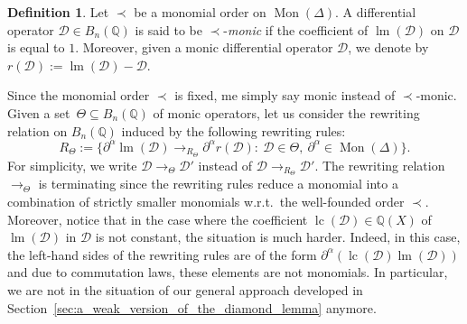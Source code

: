 \documentclass[10pt]{easychair}
\theoremstyle{definition}
\newtheorem{definition}[theorem]{Definition}
\newcommand\D{\mathcal{D}}
\DeclareMathOperator{\lm}{lm}
\DeclareMathOperator{\lc}{lc}
\newcommand\Q{\mathbb{Q}}
\newcommand\Weyl[1]{B_{#1}(\Q)}
\newcommand\monBasis{\Mon(\Delta)}
\DeclareMathOperator{\Mon}{Mon}
\newcommand\rewTheta{\to_\Theta}
\newcommand\RTheta{R_{\Theta}}
\begin{document}
\begin{definition}
  Let $\prec$ be a monomial order on $\monBasis$. A differential
  operator $\D\in\Weyl{n}$ is said to be $\prec$-{\em monic} if the
  coefficient of $\lm(\D)$ on $\D$ is equal to $1$. Moreover, given a
  monic differential operator $\D$, we denote by $r(\D):=\lm(\D)-\D$.
\end{definition}
\smallskip

Since the monomial order $\prec$ is fixed, me simply say monic instead of
$\prec$-monic. Given a set~$\Theta\subseteq\Weyl{n}$ of monic operators,
let us consider the rewriting relation on $\Weyl{n}$ induced by the
following rewriting rules: 
\begin{equation}\label{equ:rewTheta}
  \RTheta:=\Big\{\partial^\alpha\lm(\D)\to_{\RTheta}\partial^\alpha
  r(\D):\ \D\in\Theta,\ \partial^\alpha\in\Mon(\Delta)\Big\}.
\end{equation}
For simplicity, we write $\D\rewTheta\D'$ instead of
$\D\to_{R_\Theta}\D'$. The rewriting relation $\rewTheta$ is terminating
since the rewriting rules reduce a monomial into a combination of
strictly smaller monomials w.r.t.\ the well-founded order $\prec$.
Moreover, notice that in the case where the coefficient $\lc(\D)\in\Q(X)$
of $\lm(\D)$ in $\D$ is not constant, the situation is much harder.
Indeed, in this case, the left-hand sides of the rewriting rules are of
the form $\partial^\alpha(\lc(\D)\lm(\D))$ and due to commutation laws,
these elements are not monomials. In particular, we are not in the
situation of our general approach developed in  
Section~\ref{sec:a_weak_version_of_the_diamond_lemma} anymore.
\medskip
\end{document}
